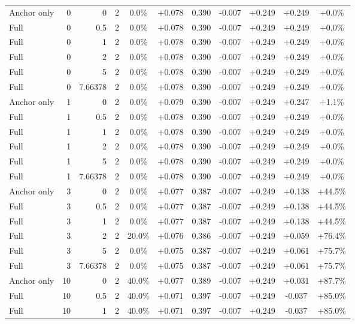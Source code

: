 \begin{table}[htbp]
\begin{tabular}{lrrrccccccc}
Anchor only & 0 & 0 & 2 & 0.0\% & +0.078 & 0.390 & -0.007 & +0.249 & +0.249 & +0.0\% \\
Full & 0 & 0.5 & 2 & 0.0\% & +0.078 & 0.390 & -0.007 & +0.249 & +0.249 & +0.0\% \\
Full & 0 & 1 & 2 & 0.0\% & +0.078 & 0.390 & -0.007 & +0.249 & +0.249 & +0.0\% \\
Full & 0 & 2 & 2 & 0.0\% & +0.078 & 0.390 & -0.007 & +0.249 & +0.249 & +0.0\% \\
Full & 0 & 5 & 2 & 0.0\% & +0.078 & 0.390 & -0.007 & +0.249 & +0.249 & +0.0\% \\
Full & 0 & 7.66378 & 2 & 0.0\% & +0.078 & 0.390 & -0.007 & +0.249 & +0.249 & +0.0\% \\
Anchor only & 1 & 0 & 2 & 0.0\% & +0.079 & 0.390 & -0.007 & +0.249 & +0.247 & +1.1\% \\
Full & 1 & 0.5 & 2 & 0.0\% & +0.078 & 0.390 & -0.007 & +0.249 & +0.249 & +0.0\% \\
Full & 1 & 1 & 2 & 0.0\% & +0.078 & 0.390 & -0.007 & +0.249 & +0.249 & +0.0\% \\
Full & 1 & 2 & 2 & 0.0\% & +0.078 & 0.390 & -0.007 & +0.249 & +0.249 & +0.0\% \\
Full & 1 & 5 & 2 & 0.0\% & +0.078 & 0.390 & -0.007 & +0.249 & +0.249 & +0.0\% \\
Full & 1 & 7.66378 & 2 & 0.0\% & +0.078 & 0.390 & -0.007 & +0.249 & +0.249 & +0.0\% \\
Anchor only & 3 & 0 & 2 & 0.0\% & +0.077 & 0.387 & -0.007 & +0.249 & +0.138 & +44.5\% \\
Full & 3 & 0.5 & 2 & 0.0\% & +0.077 & 0.387 & -0.007 & +0.249 & +0.138 & +44.5\% \\
Full & 3 & 1 & 2 & 0.0\% & +0.077 & 0.387 & -0.007 & +0.249 & +0.138 & +44.5\% \\
Full & 3 & 2 & 2 & 20.0\% & +0.076 & 0.386 & -0.007 & +0.249 & +0.059 & +76.4\% \\
Full & 3 & 5 & 2 & 0.0\% & +0.075 & 0.387 & -0.007 & +0.249 & +0.061 & +75.7\% \\
Full & 3 & 7.66378 & 2 & 0.0\% & +0.075 & 0.387 & -0.007 & +0.249 & +0.061 & +75.7\% \\
Anchor only & 10 & 0 & 2 & 40.0\% & +0.077 & 0.389 & -0.007 & +0.249 & +0.031 & +87.7\% \\
Full & 10 & 0.5 & 2 & 40.0\% & +0.071 & 0.397 & -0.007 & +0.249 & -0.037 & +85.0\% \\
Full & 10 & 1 & 2 & 40.0\% & +0.071 & 0.397 & -0.007 & +0.249 & -0.037 & +85.0\% \\

\end{tabular}
\end{table}
